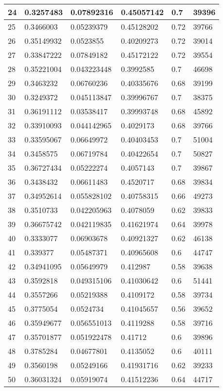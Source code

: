 \begin{longtable}{|l|l|l|l|l|l|}
24 & 0.3257483 & 0.07892316 & 0.45057142 & 0.7 & 39396 \\ \hline 
25 & 0.3466003 & 0.05239379 & 0.45128202 & 0.72 & 39766 \\ \hline 
26 & 0.35149932 & 0.0523855 & 0.40209273 & 0.72 & 39014 \\ \hline 
27 & 0.33847222 & 0.07849182 & 0.45172122 & 0.72 & 39554 \\ \hline 
28 & 0.35221004 & 0.043223448 & 0.3992585 & 0.7 & 46698 \\ \hline 
29 & 0.3463232 & 0.06760236 & 0.40335676 & 0.68 & 39199 \\ \hline 
30 & 0.3249372 & 0.045113847 & 0.39996767 & 0.7 & 38375 \\ \hline 
31 & 0.36191112 & 0.03538417 & 0.39993748 & 0.68 & 45892 \\ \hline 
32 & 0.33910093 & 0.044142965 & 0.4029173 & 0.68 & 39766 \\ \hline 
33 & 0.33595067 & 0.06649972 & 0.40403453 & 0.7 & 51004 \\ \hline 
34 & 0.3458575 & 0.06719784 & 0.40422654 & 0.7 & 50827 \\ \hline 
35 & 0.36727434 & 0.05222274 & 0.4057143 & 0.7 & 39867 \\ \hline 
36 & 0.3438432 & 0.06611483 & 0.4520717 & 0.68 & 39834 \\ \hline 
37 & 0.34952614 & 0.055828102 & 0.40758315 & 0.66 & 49273 \\ \hline 
38 & 0.3510733 & 0.042205963 & 0.4078059 & 0.62 & 39833 \\ \hline 
39 & 0.36675742 & 0.042119835 & 0.41621974 & 0.64 & 39978 \\ \hline 
40 & 0.3333077 & 0.06903678 & 0.40921327 & 0.62 & 46138 \\ \hline 
41 & 0.339377 & 0.05487371 & 0.40965608 & 0.6 & 44747 \\ \hline 
42 & 0.34941095 & 0.05649979 & 0.412987 & 0.58 & 39638 \\ \hline 
43 & 0.3592818 & 0.049315106 & 0.41030642 & 0.6 & 51441 \\ \hline 
44 & 0.3557266 & 0.05219388 & 0.4109172 & 0.58 & 39734 \\ \hline 
45 & 0.3775054 & 0.0524734 & 0.41045657 & 0.56 & 39652 \\ \hline 
46 & 0.35949677 & 0.056551013 & 0.4119288 & 0.58 & 39716 \\ \hline 
47 & 0.35701877 & 0.051922478 & 0.41712 & 0.6 & 39896 \\ \hline 
48 & 0.3785284 & 0.04677801 & 0.4135052 & 0.6 & 40111 \\ \hline 
49 & 0.3560198 & 0.05249166 & 0.41931716 & 0.62 & 39233 \\ \hline 
50 & 0.36031324 & 0.05919074 & 0.41512236 & 0.64 & 44717 \\ \hline 
\end{longtable}